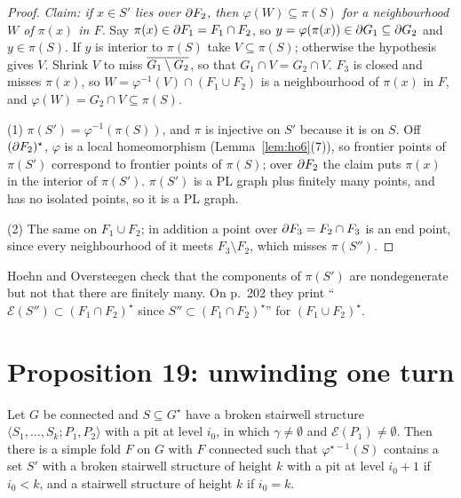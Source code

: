 \begin{proof}
\emph{Claim: if $x\in S'$ lies over $\partial F_2$, then $\varphi(W)\subseteq\pi(S)$ for a neighbourhood $W$ of $\pi(x)$ in $F$.} Say $\pi(x)\in\partial F_1=F_1\cap F_2$, so $y=\varphi(\pi(x))\in\partial G_1\subseteq\partial G_2$
and $y\in\pi(S)$. If $y$ is interior to $\pi(S)$ take $V\subseteq\pi(S)$; otherwise the hypothesis gives $V$. Shrink $V$ to miss $\overline{G_1\setminus G_2}$, so that $G_1\cap V=G_2\cap V$.
$F_3$ is closed and misses $\pi(x)$, so $W=\varphi^{-1}(V)\cap(F_1\cup F_2)$ is a neighbourhood of $\pi(x)$ in $F$, and $\varphi(W)=G_2\cap V\subseteq\pi(S)$.

(1) $\pi(S')=\varphi^{-1}(\pi(S))$, and $\pi$ is injective on $S'$ because it is on $S$. Off $(\partial F_2)^\star$, $\varphi$ is a local homeomorphism (Lemma~\ref{lem:ho6}(7)), so
frontier points of $\pi(S')$ correspond to frontier points of $\pi(S)$; over $\partial F_2$ the claim puts $\pi(x)$ in the interior of $\pi(S')$. $\pi(S')$ is a PL graph plus finitely many
points, and has no isolated points, so it is a PL graph.

(2) The same on $F_1\cup F_2$; in addition a point over $\partial F_3=F_2\cap F_3$ is an end point, since every neighbourhood of it meets $F_3\setminus F_2$, which misses $\pi(S'')$.
\end{proof}


Hoehn and Oversteegen check that the components of $\pi(S')$ are nondegenerate but not that there are finitely many. On p.~202 they print
``$\mathcal E(S'')\subset(F_1\cap F_2)^\star$ since $S''\subset(F_1\cap F_2)^\star$'' for $(F_1\cup F_2)^\star$.

\section{Proposition 19: unwinding one turn}

\begin{proposition}\label{prop:ho19}
Let $G$ be connected and $S\subseteq G^\star$ have a broken stairwell structure $\langle S_1,\dots,S_k;P_1,P_2\rangle$ with a pit at level $i_0$, in which $\gamma\neq\emptyset$ and $\mathcal E(P_1)\neq\emptyset$.
Then there is a simple fold $F$ on $G$ with $F$ connected such that $\varphi^{\star-1}(S)$ contains a set $S'$ with a broken stairwell structure of height $k$ with a pit at level $i_0+1$ if
$i_0<k$, and a stairwell structure of height $k$ if $i_0=k$.
\end{proposition}

